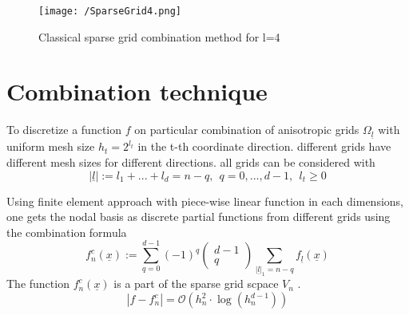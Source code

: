 	\begin{figure}
			\centering
			\texttt{[image: /SparseGrid4.png]}
			\caption{Classical sparse grid combination method for l=4}
			\label{fig:Sparsegrid4}
		\end{figure}

\section{Combination technique}
To discretize a function $f$ on particular combination of anisotropic grids $\Omega_{\underline{l}}$ with uniform mesh size $h_{t} = 2^{l_{t}}$ in the t-th coordinate direction.  different grids have different mesh sizes for different directions. 
all grids can be considered with
\begin{equation}
	|\underline{l}| := l_1 + ... + l_d = n-q, \ \ q = 0,...,d - 1, \ \ l_t \ge 0
\end{equation}

Using finite element approach with piece-wise linear function in each dimensions, one gets the nodal basis as discrete partial functions from different grids using the combination formula
\begin{equation}
	f_n^c(\underline{x}) := \sum_{q=0}^{d-1}(-1)^q \left( \begin{array}{c}
	d-1 \\
	q  \end{array} \right) \sum_{|\underline{l}|_1=n-q} f_{\underline{l}}(\underline{x})
\end{equation}
The function $f_n^c(\underline{x})$ is a part of the sparse grid scpace $V_{n}$ .
\begin{equation}
	|f-f_n^c| = \mathcal{O}\left(h_n^2 \cdot \log(h_{n}^{d-1}) \right)
\end{equation}


